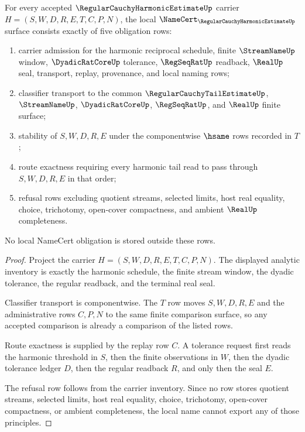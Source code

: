 \begin{theorem}
\label{thm:regular-cauchy-harmonic-estimate-obligations}
For every accepted $\RegularCauchyHarmonicEstimateUp$ carrier
$H=(S,W,D,R,E,T,C,P,N)$, the local $\NameCert_{\RegularCauchyHarmonicEstimateUp}$ surface consists exactly of five obligation rows:
\begin{enumerate}
  \item carrier admission for the harmonic reciprocal schedule, finite $\StreamNameUp$ window, $\DyadicRatCoreUp$ tolerance, $\RegSeqRatUp$ readback, $\RealUp$ seal, transport, replay, provenance, and local naming rows;
  \item classifier transport to the common $\RegularCauchyTailEstimateUp$, $\StreamNameUp$, $\DyadicRatCoreUp$, $\RegSeqRatUp$, and $\RealUp$ finite surface;
  \item stability of $S,W,D,R,E$ under the componentwise $\hsame$ rows recorded in $T$;
  \item route exactness requiring every harmonic tail read to pass through $S,W,D,R,E$ in that order;
  \item refusal rows excluding quotient streams, selected limits, host real equality, choice, trichotomy, open-cover compactness, and ambient $\RealUp$ completeness.
\end{enumerate}
No local NameCert obligation is stored outside these rows.
\end{theorem}
\begin{proof}
Project the carrier $H=(S,W,D,R,E,T,C,P,N)$. The displayed analytic inventory is exactly the harmonic schedule, the finite stream window, the dyadic tolerance, the regular readback, and the terminal real seal.

Classifier transport is componentwise. The $T$ row moves $S,W,D,R,E$ and the administrative rows $C,P,N$ to the same finite comparison surface, so any accepted comparison is already a comparison of the listed rows.

Route exactness is supplied by the replay row $C$. A tolerance request first reads the harmonic threshold in $S$, then the finite observations in $W$, then the dyadic tolerance ledger $D$, then the regular readback $R$, and only then the seal $E$.

The refusal row follows from the carrier inventory. Since no row stores quotient streams, selected limits, host real equality, choice, trichotomy, open-cover compactness, or ambient completeness, the local name cannot export any of those principles.
\end{proof}

